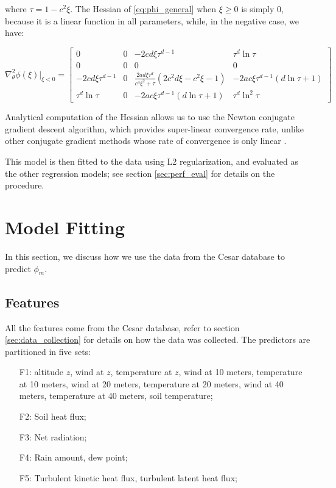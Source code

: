 \documentclass[a4paper]{book}
\begin{document}
where $\tau=1-c^2\xi$. The Hessian of \ref{eq:phi_general} when $\xi\geq 0$ is simply 0, because it is a linear function in all parameters, while, in the negative case, we have:

\begin{equation}
\nabla^2_\theta\phi(\xi)\vert_{\xi<0} = \begin{bmatrix}
0 & 0 & - 2 c d \xi \tau^{d - 1} & \tau^{d} \ln{\tau} \\
0 & 0 & 0 & 0 \\
- 2 c d \xi \tau^{d - 1} &
0 & \frac{2ad\xi\tau^{d}}{c^4\xi^2+\tau}\left(2c^2d\xi-c^2\xi-1\right) & -2ac\xi\tau^{d-1}\left(d\ln\tau+1\right) \\
\tau^d \ln\tau & 0 &
-2ac\xi\tau^{d-1}\left(d\ln\tau+1\right) &
\tau^d\ln^2\tau
\end{bmatrix}
\end{equation}

Analytical computation of the Hessian allows us to use the Newton conjugate gradient descent algorithm, which provides super-linear convergence rate, unlike other conjugate gradient methods whose rate of convergence is only linear \citep{numopt}.

This model is then fitted to the data using L2 regularization, and evaluated as the other regression models; see section \ref{sec:perf_eval} for details on the procedure.

\section{Model Fitting}
\label{sec:model_fit}
In this section, we discuss how we use the data from the Cesar database to predict $\phi_m$.

\subsection{Features}
All the features come from the Cesar database, refer to section \ref{sec:data_collection} for details on how the data was collected. The predictors are partitioned in five sets:

\begin{enumerate}
\item[F1:] altitude $z$, wind at $z$, temperature at $z$, wind at 10 meters, temperature at 10 meters, wind at 20 meters, temperature at 20 meters, wind at 40 meters, temperature at 40 meters, soil temperature;
\item[F2:] Soil heat flux;
\item[F3:] Net radiation;
\item[F4:] Rain amount, dew point;
\item[F5:] Turbulent kinetic heat flux, turbulent latent heat flux;
\end{enumerate}
\end{document}

